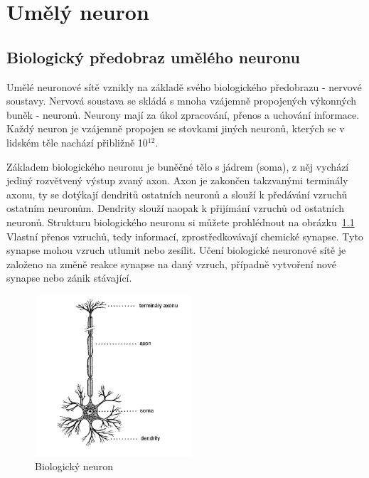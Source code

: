 \documentclass[11pt,twoside,a4paper]{book}
\begin{document}
\chapter{Umělý neuron}
\section{Biologický předobraz umělého neuronu}
Umělé neuronové sítě vznikly na základě svého biologického předobrazu - nervové soustavy. Nervová soustava se skládá s mnoha vzájemně propojených výkonných buněk - neuronů. Neurony mají za úkol zpracování, přenos a uchování informace. Každý neuron je vzájemně propojen se stovkami jiných neuronů, kterých se v lidském těle nachází přibližně 10\begin{math} ^{12}\end{math}.\cite{skripta}

Základem biologického neuronu je buněčné tělo s jádrem (soma), z něj vychází jediný rozvětvený výstup zvaný axon. Axon je zakončen takzvanými terminály axonu, ty se dotýkají dendritů ostatních neuronů a slouží k předávání vzruchů ostatním neuronům. Dendrity slouží naopak k přijímání vzruchů od ostatních neuronů. Strukturu biologického neuronu si můžete prohlédnout na obrázku~\ref{fig:bioneuron} Vlastní přenos vzruchů, tedy informací, zprostředkovávají chemické synapse. Tyto synapse mohou vzruch utlumit nebo zesílit. Učení biologické neuronové sítě je založeno na změně reakce synapse na daný vzruch, případně vytvoření nové synapse nebo zánik stávající.

\begin{figure}[!h]
\begin{center}
\includegraphics[height=6cm]{figures/bioneuron.png}
\caption{Biologický neuron\cite{teoret}}
\label{fig:bioneuron}
\end{center}
\end{figure}
\end{document}

